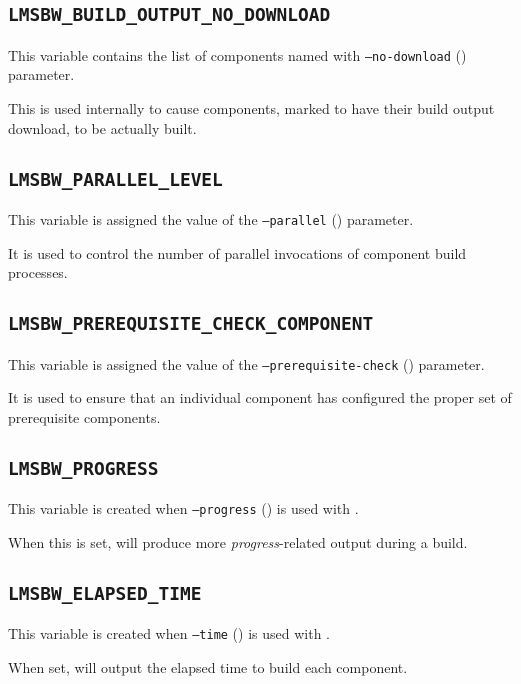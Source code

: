 \subsection{\texttt{LMSBW\_BUILD\_OUTPUT\_NO\_DOWNLOAD}}

This variable contains the list of components named with
\texttt{--no-download} () parameter.

This is used internally to cause components, marked to have their
build output download, to be actually built.

\subsection{\texttt{LMSBW\_PARALLEL\_LEVEL}}

This variable is assigned the value of the \texttt{--parallel}
() parameter.

It is used to control the number of parallel invocations of component
build processes.

\subsection{\texttt{LMSBW\_PREREQUISITE\_CHECK\_COMPONENT}}

This variable is assigned the value of the
\texttt{--prerequisite-check} ()
parameter.

It is used to ensure that an individual component has configured the
proper set of prerequisite components.

\subsection{\texttt{LMSBW\_PROGRESS}}

This variable is created when \texttt{--progress}
() is used with \lmsbwcmd.

When this is set, \lmsbw will produce more \emph{progress}-related
output during a build.

\subsection{\texttt{LMSBW\_ELAPSED\_TIME}}

This variable is created when \texttt{--time} ()
is used with \lmsbwcmd.

When set, \lmsbw will output the elapsed time to build each component.

